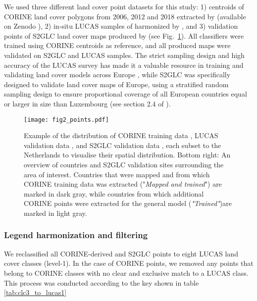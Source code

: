         We used three different land cover point datasets for this study: 1) centroids of CORINE land cover polygons from 2006, 2012 and 2018 extracted by \citet{witjes2022spatiotemporal} (available on Zenodo \citep{landa2021multi}), 2) in-situ LUCAS samples of harmonized by \citet{dandrimont2020harmonised}, and 3) validation points of S2GLC land cover maps \citep{malinowski2020automated} produced by \citet{jenerowicz2021validation} (see Fig.~\ref{fig:points}). All classifiers were trained using CORINE centroids as reference, and all produced maps were validated on S2GLC and LUCAS samples. The strict sampling design and high accuracy of the LUCAS survey has made it a valuable resource in training and validating land cover models across Europe \citep{benevides2021land,pflugmacher2019mapping,sparks2022mapping,verhegghen2021accuracy,witjes2022spatiotemporal}, while S2GLC was specifically designed to validate land cover maps of Europe, using a stratified random sampling design to ensure proportional coverage of all European countries equal or larger in size than Luxembourg (see section 2.4 of \citet{malinowski2020automated}).

        \begin{figure}
        \centering
        \texttt{[image: fig2\_points.pdf]}
        
        \caption{Example of the distribution of CORINE training data \citep{witjes2022spatiotemporal}, LUCAS validation data \citep{dandrimont2020harmonised}, and S2GLC validation data \citep{jenerowicz2021validation}, each subset to the Netherlands to visualise their spatial distribution. Bottom right: An overview of countries and S2GLC validation sites surrounding the area of interest. Countries that were mapped and from which CORINE training data was extracted ("\textit{Mapped and trained}") are marked in dark gray, while countries from which additional CORINE points were extracted for the general model (\textit{"Trained"})are marked in light gray.}
        \label{fig:points}
        \end{figure}

    \subsubsection{Legend harmonization and filtering}
    
        We reclassified all CORINE-derived and S2GLC points to eight LUCAS land cover classes (level-1). In the case of CORINE points, we removed any points that belong to CORINE classes with no clear and exclusive match to a LUCAS class. This process was conducted according to the key shown in table \ref{tab:clc3_to_lucas1}

